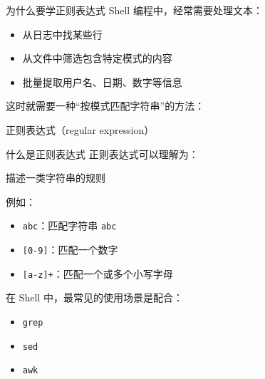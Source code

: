 \documentclass[aspectratio=169]{beamer}
\begin{document}
\begin{frame}{为什么要学正则表达式}
Shell 编程中，经常需要处理文本：

\begin{itemize}
  \item 从日志中找某些行
  \item 从文件中筛选包含特定模式的内容
  \item 批量提取用户名、日期、数字等信息
\end{itemize}

\vspace{0.8em}
这时就需要一种“按模式匹配字符串”的方法：

\begin{center}
\Large
正则表达式（regular expression）
\end{center}
\end{frame}

\begin{frame}{什么是正则表达式}
正则表达式可以理解为：

\begin{center}
\Large
描述一类字符串的规则
\end{center}

\vspace{0.8em}
例如：
\begin{itemize}
  \item \texttt{abc}：匹配字符串 \texttt{abc}
  \item \texttt{[0-9]}：匹配一个数字
  \item \texttt{[a-z]+}：匹配一个或多个小写字母
\end{itemize}

\vspace{0.8em}
在 Shell 中，最常见的使用场景是配合：
\begin{itemize}
  \item \texttt{grep}
  \item \texttt{sed}
  \item \texttt{awk}
\end{itemize}
\end{frame}
\end{document}
